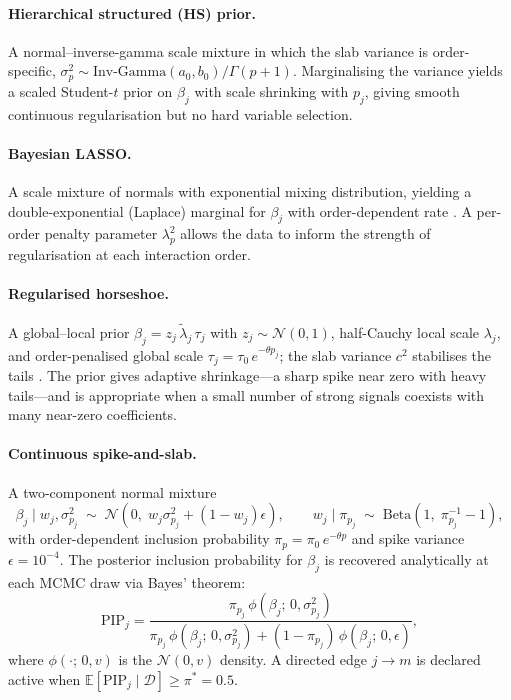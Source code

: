 \documentclass[12pt]{article}
\begin{document}
\paragraph{Hierarchical structured (HS) prior.} A normal--inverse-gamma scale mixture in which the slab variance is order-specific, $\sigma^2_p \sim \mathrm{Inv\text{-}Gamma}(a_0, b_0) / \Gamma(p+1)$. Marginalising the variance yields a scaled Student-$t$ prior on $\beta_j$ with scale shrinking with $p_j$, giving smooth continuous regularisation but no hard variable selection.

\paragraph{Bayesian LASSO.} A scale mixture of normals with exponential mixing distribution, yielding a double-exponential (Laplace) marginal for $\beta_j$ with order-dependent rate \citep{ParkCasella2008}. A per-order penalty parameter $\lambda^2_p$ allows the data to inform the strength of regularisation at each interaction order.

\paragraph{Regularised horseshoe.} A global--local prior $\beta_j = z_j\,\tilde{\lambda}_j\,\tau_j$ with $z_j \sim \mathcal{N}(0,1)$, half-Cauchy local scale $\lambda_j$, and order-penalised global scale $\tau_j = \tau_0\, e^{-\theta p_j}$; the slab variance $c^2$ stabilises the tails \citep{PiironenVehtari2017}. The prior gives adaptive shrinkage---a sharp spike near zero with heavy tails---and is appropriate when a small number of strong signals coexists with many near-zero coefficients.

\paragraph{Continuous spike-and-slab.} A two-component normal mixture
\[
\beta_j \mid w_j, \sigma^2_{p_j} \;\sim\; \mathcal{N}\!\left(0,\; w_j \sigma^2_{p_j} + (1 - w_j)\epsilon\right),
\qquad
w_j \mid \pi_{p_j} \;\sim\; \mathrm{Beta}\!\left(1,\; \pi_{p_j}^{-1} - 1\right),
\]
with order-dependent inclusion probability $\pi_p = \pi_0\, e^{-\theta p}$ and spike variance $\epsilon = 10^{-4}$. The posterior inclusion probability for $\beta_j$ is recovered analytically at each MCMC draw via Bayes' theorem:
\begin{equation}\label{eq:pip}
\mathrm{PIP}_j = \frac{\pi_{p_j}\,\phi(\beta_j;\, 0, \sigma^2_{p_j})}{\pi_{p_j}\,\phi(\beta_j;\, 0, \sigma^2_{p_j}) + (1 - \pi_{p_j})\,\phi(\beta_j;\, 0, \epsilon)},
\end{equation}
where $\phi(\cdot;\, 0, v)$ is the $\mathcal{N}(0, v)$ density. A directed edge $j \to m$ is declared active when $\mathbb{E}[\mathrm{PIP}_j \mid \mathcal{D}] \geq \pi^* = 0.5$.
\end{document}
